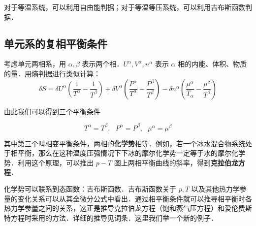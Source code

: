 对于等温系统，可以利用自由能判据；对于等温等压系统，可以利用吉布斯函数判据．

\subsection{单元系的复相平衡条件}
考虑单元两相系，用 $\alpha,\beta$ 表示两个相．$U^\alpha,V^\alpha,n^\alpha$ 表示 $\alpha$ 相的内能、体积、物质的量．用熵判据进行类似计算：
\begin{equation}
\delta S=\delta U^\alpha\left(\frac{1}{T^\alpha}-\frac{1}{T^\beta}\right)+\delta V^\alpha\left(\frac{P^\alpha}{T^\alpha}-\frac{P^\beta}{T^\beta}\right)
-\delta n^\alpha\left(\frac{\mu^\alpha}{T_\alpha}-\frac{\mu^\beta}{T^\beta}\right)
\end{equation}

由此我们可以得到三个平衡条件

\begin{equation}
T^\alpha=T^\beta,\ \ \ P^\alpha=P^\beta,\ \ \ \mu^\alpha=\mu^\beta
\end{equation}

其中第三个叫相变平衡条件，两相的\textbf{化学势}相等．例如，若一个冰水混合物系统处于相平衡，那么在这种温度压强情况下下冰的摩尔化学势一定等于水的摩尔化学势．利用这个原理，可以推出 $p-T$ 图上两相平衡曲线的斜率，得到\textbf{克拉伯龙方程}．

化学势可以联系到态函数：吉布斯函数．吉布斯函数关于 $p,T$ 以及其他热力学参量的变化关系可以从其全微分公式中看出．通过相平衡条件就可以推导相平衡时各热力学参量之间的关系，这正是推导克拉伯龙方程（饱和蒸气压方程）和爱伦费斯特方程时采用的方法．详细的推导见词条．这里我们举一个新的例子．

